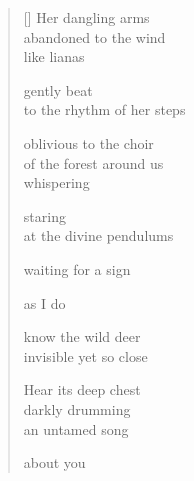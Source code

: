 \documentclass[12pt,a4paper]{article}
\begin{document}
\thispagestyle{empty}

\poemtitle{}

\settowidth{\versewidth}{to the rhythm of her steps}

\bigskip

\begin{verse}[\versewidth]
  Her dangling arms \\
  abandoned to the wind \\
  like lianas

  gently beat \\
  to the rhythm of her steps

  oblivious to the choir \\
  of the forest around us \\
  whispering

  staring \\
  at the divine pendulums

  waiting for a sign

  as I do

  know the wild deer \\
  invisible yet so close

  Hear its deep chest \\
  darkly drumming \\
  an untamed song

  about you
\end{verse}
\end{document}
